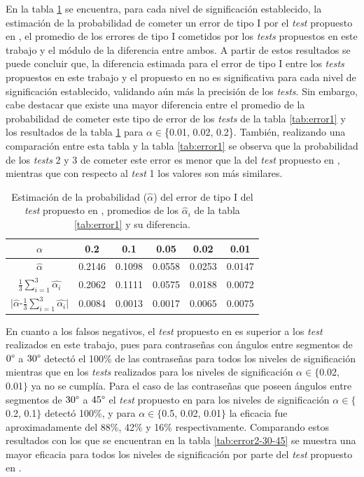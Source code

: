\documentclass[12pt]{report}
\begin{document}
En la tabla \ref{tab:erro1-sensor} se encuentra, para cada nivel de significación establecido, la estimación de la probabilidad de cometer un error de tipo I por el \textit{test} propuesto en \cite{13}, el promedio de los errores de tipo I cometidos por los \textit{tests} propuestos en este trabajo y el módulo de la diferencia entre ambos.
A partir de estos resultados se puede concluir que, la diferencia estimada para el error de tipo I entre los \textit{tests} propuestos en este trabajo y el propuesto en \cite{13} no es significativa para cada nivel de significación
establecido, validando aún más la precisión de los \textit{tests}.  
Sin embargo, cabe destacar que existe una mayor diferencia entre el promedio de la probabilidad de cometer este tipo de error de los \textit{tests} de la tabla \ref{tab:error1} y los resultados de la tabla \ref{tab:erro1-sensor} para $\alpha \in$\{0.01, 0.02, 0.2\}. También, realizando una comparación entre esta tabla y la tabla \ref{tab:error1} se observa que la probabilidad de los \textit{tests} 2 y 3 de cometer este error es menor que la del \textit{test} propuesto en \cite{13}, mientras que con respecto al \textit{test} 1 los valores son más similares.

\begin{table}[h!]
	\centering
		\caption{Estimación de la probabilidad ($\hat{\alpha}$) del error de tipo I del \textit{test} propuesto en \cite{13}, promedios de los $\hat{\alpha}_i$ de la tabla \ref{tab:error1} y su diferencia.}
	\begin{tabular}{|c|ccccc|}
		\hline
		$\alpha$ &  0.2 & 0.1 & 0.05 & 0.02 & 0.01 \\
		\hline
		$\hat{\alpha}$ & 0.2146 & 0.1098 & 0.0558 & 0.0253 & 0.0147 \\
		$\frac{1}{3} \sum_{i=1}^{3} \hat{\alpha_i}$		
		&0.2062	&	0.1111	&	0.0575	&	0.0188	&0.0072	\\	
		\hline
		$|\hat{\alpha}$-$\frac{1}{3} \sum_{i=1}^{3} \hat{\alpha_i}|$ & 0.0084  & 0.0013 &  0.0017 &0.0065  &  0.0075 \\
		\hline
	\end{tabular}

	\label{tab:erro1-sensor}
\end{table}

En cuanto a los falsos negativos, el \textit{test} propuesto en \cite{13} es superior a los \textit{test} realizados en este trabajo, pues para contraseñas con ángulos entre segmentos de  $0\degree$ a $30\degree$ detectó el 100\% de las contraseñas para todos los niveles de significación mientras que en los \textit{tests} realizados para los niveles de significación  $\alpha \in \{$0.02, 0.01$\}$ ya no se cumplía. Para el caso de las contraseñas que poseen ángulos entre segmentos de $30\degree$ a $45\degree$ el \textit{test} propuesto en \cite{13} para los niveles de significación $\alpha \in \{$0.2, 0.1$\}$ detectó 100\%, y para $\alpha \in \{$0.5, 0.02, 0.01$\}$ la eficacia fue aproximadamente  del 88\%, 42\% y 16\% respectivamente. Comparando estos resultados con los que se encuentran en la tabla \ref{tab:error2-30-45} se muestra una mayor eficacia para todos los niveles de significación por parte del \textit{test} propuesto en \cite{13}.
\end{document}
